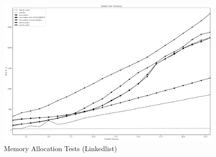 \begin{figure}
    \centering
    \caption{Memory Allocation Tests (Linkedlist)}\label{plot:linkedlist}
    \includegraphics[scale=0.35]{malloc/linkedlist.pdf}
\end{figure}


\endinput



-R read-only load generated, if this is used, -W option should NOT be used 
-Wn where n means
  2  - 2:1 read-write ratio
  3  - 3:1 read-write ratio
  5  - 1:1 read-write ratio
  7  - 2:1 read-Non Temporal Write ratio
  8  - 1:1 read-Non Temporal Write ratio
  10 - 2:1 read-Non Temporal Write ratio (stream triad-like)


dram-baseline-nt-write-same-node.pdf
nt-write-both-nodes.pdf
random-r.pdf
random-W2.pdf
random-W5.pdf
random-w6.pdf
random-W7.pdf
random-W8.pdf
sequential-r.pdf
sequential-w10.pdf
sequential-W2.pdf
sequential-w3.pdf
sequential-W5.pdf
sequential-w6.pdf
sequential-W7.pdf

aep_eval_bandwidth-crop.pdf
aep_eval_idle_latency-crop.pdf
aep_eval_random_read_load_latency-crop.pdf
node-specific-latency-versus-delay-crop.pdf
node-specific-load-data-crop.pdf


